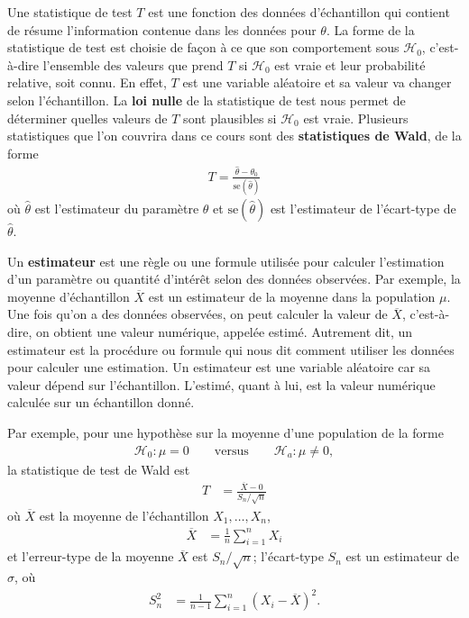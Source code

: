 \documentclass[
  11pt,
  letterpaper,
]{book}
\begin{document}
Une statistique de test \(T\) est une fonction des données d'échantillon qui contient de résume l'information contenue dans les données pour \(\theta\). La forme de la statistique de test est choisie de façon à ce que son comportement sous \(\mathscr{H}_0\), c'est-à-dire l'ensemble des valeurs que prend \(T\) si \(\mathscr{H}_0\) est vraie et leur probabilité relative, soit connu. En effet, \(T\) est une variable aléatoire et sa valeur va changer selon l'échantillon. La \textbf{loi nulle} de la statistique de test nous permet de déterminer quelles valeurs de \(T\) sont plausibles si \(\mathscr{H}_0\) est vraie. Plusieurs statistiques que l'on couvrira dans ce cours sont des \textbf{statistiques de Wald}, de la forme
\begin{align*}
T = \frac{\widehat{\theta} - \theta_0}{\mathrm{se}(\widehat{\theta})} 
\end{align*}
où \(\widehat{\theta}\) est l'estimateur du paramètre \(\theta\) et \(\mathrm{se}(\widehat{\theta})\) est l'estimateur de l'écart-type de \(\widehat{\theta}\).

Un \textbf{estimateur} est une règle ou une formule utilisée pour calculer l'estimation d'un paramètre ou quantité d'intérêt selon des données observées. Par exemple, la moyenne d'échantillon \(\overline{X}\) est un estimateur de la moyenne dans la population \(\mu\). Une fois qu'on a des données observées, on peut calculer la valeur de \(\overline{X}\), c'est-à-dire, on obtient une valeur numérique, appelée estimé. Autrement dit, un estimateur est la procédure ou formule qui nous dit comment utiliser les données pour calculer une estimation. Un estimateur est une variable aléatoire car sa valeur dépend sur l'échantillon. L'estimé, quant à lui, est la valeur numérique calculée sur un échantillon donné.

Par exemple, pour une hypothèse sur la moyenne d'une population de la forme
\begin{align*}
\mathscr{H}_0: \mu=0 \qquad \text{versus} \qquad \mathscr{H}_a:\mu \neq 0, 
\end{align*}
la statistique de test de Wald est
\begin{align*}
T &= \frac{\overline{X}-0}{S_n/\sqrt{n}}
\end{align*}
où \(\overline{X}\) est la moyenne de l'échantillon \(X_1, \ldots, X_n\),
\begin{align*}
\overline{X} &= \frac{1}{n} \sum_{i=1}^n X_i
\end{align*}
et l'erreur-type de la moyenne \(\overline{X}\) est \(S_n/\sqrt{n}\); l'écart-type \(S_n\) est un estimateur de \(\sigma\), où
\begin{align*}
S^2_n &= \frac{1}{n-1} \sum_{i=1}^n (X_i-\overline{X})^2.
\end{align*}
\end{document}
